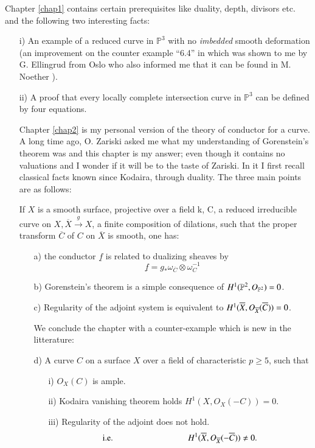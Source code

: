 Chapter \ref{chap1} contains certain prerequisites like duality,
depth, divisors etc. and the following two interesting facts:
\begin{itemize}
\item [i)] An example of a reduced curve in $\mathbb{P}^3$ with no
{\it imbedded} smooth deformation (an improvement on the counter
example ``6.4'' in \cite{key11} which was shown to me by G. Ellingrud
from Oslo who also informed me that it can be found in
M. Noether \cite{key10}). 
\item [ii)] A proof that every locally complete intersection curve in
$\mathbb{P}^3$ can be defined by four equations.

Chapter \ref{chap2} is my personal version of the theory of conductor
for a curve. A long time ago, O. Zariski asked me what my
understanding of Gorenstein's theorem was and this chapter is my
answer; even though it contains no valuations and I wonder if it will
be to the taste of Zariski. In it I first recall classical
facts known since Kodaira, through duality. The three
main points are as follows:

If $X$ is a smooth surface, projective over a field k, C, a reduced
irreducible curve on $X, \overline{X}\xrightarrow{g} X$, a finite
composition of dilations, such that the proper transform
$\overline{C}$ of $C$ on $\overline{X}$ is smooth, one has:
\begin{itemize}
\item [a)] the conductor $\underline{f}$ is related to dualizing
sheaves by 
$$
\underline{f}=g_*\omega_{\overline{C}}\otimes\omega_C^{-1}
$$
\item [b)] Gorenstein's theorem is a simple consequence of
$H^1(\mathbb{P}^2,\break O_{\mathbb{P}^2})=0$. 

\item [c)] Regularity of the adjoint system is equivalent to
$H^1(\overline{X},\break O_{\overline{X}}(\overline{C}))=0$.



We conclude the chapter with a counter-example which is new in the
litterature:
\item [d)] A curve $C$ on a surface $X$ over a field of characteristic
$p\geq 5$, such that 
\begin{itemize}
\item [i)] $O_X(C)$ is ample.
\item [ii)] Kodaira vanishing theorem holds \ie $H^1(X, O_X(-C))=0$. 
\item [iii)] Regularity of the adjoint does not hold.
$$
\text{\ie}\hspace{3cm} H^1(\overline{X}, O_{\overline{X}}(-\overline{C}))\neq
0.
$$


\end{itemize}
\end{itemize}
\end{itemize}
